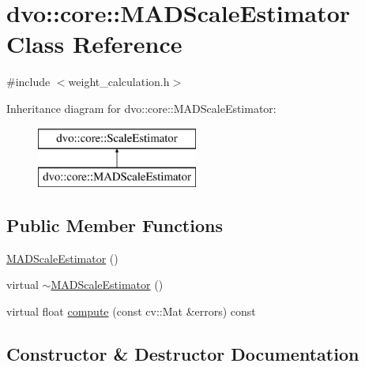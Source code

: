 \hypertarget{classdvo_1_1core_1_1_m_a_d_scale_estimator}{}\section{dvo\+:\+:core\+:\+:M\+A\+D\+Scale\+Estimator Class Reference}
\label{classdvo_1_1core_1_1_m_a_d_scale_estimator}


{\ttfamily \#include $<$weight\+\_\+calculation.\+h$>$}

Inheritance diagram for dvo\+:\+:core\+:\+:M\+A\+D\+Scale\+Estimator\+:\begin{figure}[H]
\begin{center}
\leavevmode
\includegraphics[height=2.000000cm]{classdvo_1_1core_1_1_m_a_d_scale_estimator}
\end{center}
\end{figure}
\subsection*{Public Member Functions}
\begin{DoxyCompactItemize}
\item 
\mbox{\hyperlink{classdvo_1_1core_1_1_m_a_d_scale_estimator_a63a14a6ff40fcc659ceabbac3b229257}{M\+A\+D\+Scale\+Estimator}} ()
\item 
virtual \mbox{\hyperlink{classdvo_1_1core_1_1_m_a_d_scale_estimator_a8192c59f11b969eec2179abe8dc176b5}{$\sim$\+M\+A\+D\+Scale\+Estimator}} ()
\item 
virtual float \mbox{\hyperlink{classdvo_1_1core_1_1_m_a_d_scale_estimator_a421acf5af118ef5b9c394cfd5fadea1d}{compute}} (const cv\+::\+Mat \&errors) const
\end{DoxyCompactItemize}


\subsection{Constructor \& Destructor Documentation}
\mbox{\label{classdvo_1_1core_1_1_m_a_d_scale_estimator_a63a14a6ff40fcc659ceabbac3b229257}} 
